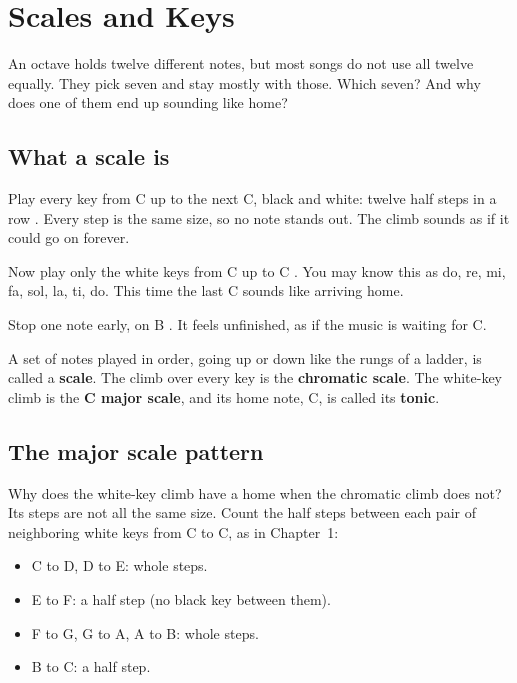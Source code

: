 \chapter{Scales and Keys}
\label{ch:scales-and-keys}
\chapterline

An octave holds twelve different notes, but most songs do not use all twelve equally. They pick seven and stay mostly with those. Which seven? And why does one of them end up sounding like home?

\section{What a scale is}

Play every key from C up to the next C, black and white: twelve half steps in a row . Every step is the same size, so no note stands out. The climb sounds as if it could go on forever.

Now play only the white keys from C up to C . You may know this as do, re, mi, fa, sol, la, ti, do. This time the last C sounds like arriving home.

Stop one note early, on B . It feels unfinished, as if the music is waiting for C.

A set of notes played in order, going up or down like the rungs of a ladder, is called a \textbf{scale}. The climb over every key is the \textbf{chromatic scale}. The white-key climb is the \textbf{C major scale}, and its home note, C, is called its \textbf{tonic}.

\section{The major scale pattern}

Why does the white-key climb have a home when the chromatic climb does not? Its steps are not all the same size. Count the half steps between each pair of neighboring white keys from C to C, as in Chapter~1:
\begin{itemize}
  \item C to D, D to E: whole steps.
  \item E to F: a half step (no black key between them).
  \item F to G, G to A, A to B: whole steps.
  \item B to C: a half step.
\end{itemize}

